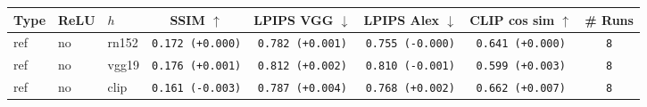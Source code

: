 \begin{tabular}{|l|l|l|c|c|c|c|c|}
\hline
Type & ReLU & $h$ & SSIM $\uparrow$ & LPIPS VGG $\downarrow$ & LPIPS Alex $\downarrow$ & CLIP cos sim $\uparrow$ & \# Runs \\
\hline
ref & no & rn152 & \texttt{0.172 {\color{black}(+0.000)}} & \texttt{0.782 {\color{red}(+0.001)}} & \texttt{0.755 {\color{black}(-0.000)}} & \texttt{0.641 {\color{black}(+0.000)}} & \texttt{8} \\
\hline
ref & no & vgg19 & \texttt{0.176 {\color{green}(+0.001)}} & \texttt{0.812 {\color{red}(+0.002)}} & \texttt{0.810 {\color{green}(-0.001)}} & \texttt{0.599 {\color{green}(+0.003)}} & \texttt{8} \\
\hline
ref & no & clip & \texttt{0.161 {\color{red}(-0.003)}} & \texttt{0.787 {\color{red}(+0.004)}} & \texttt{0.768 {\color{red}(+0.002)}} & \texttt{0.662 {\color{green}(+0.007)}} & \texttt{8} \\
\hline
\end{tabular}
